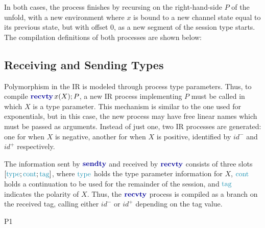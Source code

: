 In both cases, the process finishes by recursing on the right-hand-side $P$ of the unfold, with a new environment where $x$ is bound to a new channel state equal to its previous state, but with offset $0$, as a new segment of the session type starts. The compilation definitions of both processes are shown below:
\begin{minipage}{0.45\textwidth}
    \begin{compilation}{\theta}{\Delta}{}
    {}
    \end{compilation}
\end{minipage}
\hfill
\begin{minipage}{0.45\textwidth}
    \begin{compilation}{\theta}{\Delta}{}
    {}
    \end{compilation}
\end{minipage}

\subsection{Receiving and Sending Types}

Polymorphism in the \ac{IR} is modeled through process type parameters. Thus, to compile $\recvtyc{x}{X}P$, a new \ac{IR} process implementing $P$ must be called in which $X$ is a type parameter. This mechanism is similar to the one used for exponentials, but in this case, the new process may have free linear names which must be passed as arguments. Instead of just one, two \ac{IR} processes are generated: one for when $X$ is negative, another for when $X$ is positive, identified by $id^-$ and $id^+$ respectively.

The information sent by $\sendtyp$ and received by $\recvtyp$ consists of three slots $\seqst{\types; \conts; \tags}$, where $\types$ holds the type parameter information for $X$, $\conts$ holds a continuation to be used for the remainder of the session, and $\tags$ indicates the polarity of $X$. Thus, the $\recvtyp$ process is compiled as a branch on the received tag, calling either $id^-$ or $id^+$ depending on the tag value.
\begin{compilation}{\theta}{\Delta}{P}{1}
\end{compilation}

